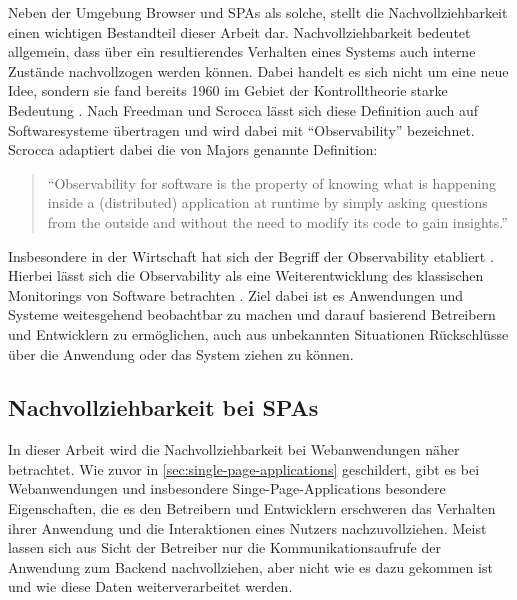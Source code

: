 Neben der Umgebung Browser und SPAs als solche, stellt die Nachvollziehbarkeit einen wichtigen Bestandteil dieser Arbeit dar. Nachvollziehbarkeit bedeutet allgemein, dass über ein resultierendes Verhalten eines Systems auch interne Zustände nachvollzogen werden können. Dabei handelt es sich nicht um eine neue Idee, sondern sie fand bereits 1960 im Gebiet der Kontrolltheorie starke Bedeutung \cite{OnTheGeneralTheoryOfControlSystems}. Nach Freedman \cite{TestabilityOfSoftwareComponents} und Scrocca \etal \cite{TheKaijuProjectPaper} lässt sich diese Definition auch auf Softwaresysteme übertragen und wird dabei mit \enquote{Observability} bezeichnet. Scrocca adaptiert dabei die von Majors \cite{MajorsObservability} genannte Definition:

\begin{quotation}
\enquote{Observability for software is the property of knowing what is happening inside a (distributed) application at runtime by simply asking questions from the outside and without the need to modify its code to gain insights.}
\end{quotation}

Insbesondere in der Wirtschaft hat sich der Begriff der Observability etabliert \cite{DynatraceObservability} \cite{NewRelicObservability}. Hierbei lässt sich die Observability als eine Weiterentwicklung des klassischen Monitorings von Software betrachten \cite{TheNewStackMonitoringAndObservability}. Ziel dabei ist es Anwendungen und Systeme weitesgehend beobachtbar zu machen und darauf basierend Betreibern und Entwicklern zu ermöglichen, auch aus unbekannten Situationen Rückschlüsse über die Anwendung oder das System ziehen zu können.

\subsection{Nachvollziehbarkeit bei SPAs}
\label{sec:nachvollziehbarkeit-bei-spas}

In dieser Arbeit wird die Nachvollziehbarkeit bei Webanwendungen näher betrachtet. Wie zuvor in \autoref{sec:single-page-applications} geschildert, gibt es bei Webanwendungen und insbesondere Singe-Page-Applications besondere Eigenschaften, die es den Betreibern und Entwicklern erschweren das Verhalten ihrer Anwendung und die Interaktionen eines Nutzers nachzuvollziehen. Meist lassen sich aus Sicht der Betreiber nur die Kommunikationsaufrufe der Anwendung zum Backend nachvollziehen, aber nicht wie es dazu gekommen ist und wie diese Daten weiterverarbeitet werden.

